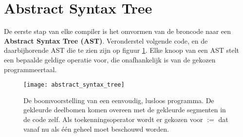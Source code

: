 \section{Abstract Syntax Tree}
De eerste stap van elke compiler is het omvormen van de broncode naar een \textbf{Abstract Syntax Tree (AST)}. Veronderstel volgende code, en de daarbijhorende AST die te zien zijn op figuur \ref{fig:abstract_syntax_tree}. Elke knoop van een AST stelt een bepaalde geldige operatie voor, die onafhankelijk is van de gekozen programmeertaal.
\begin{figure}[h]
	\centering
	\texttt{[image: abstract\_syntax\_tree]}
	\caption{De boomvoorstelling van een eenvoudig, lusloos programma. De gekleurde deelbomen komen overeen met de gekleurde segmenten in de code zelf. Als toekenningsoperator wordt er gekozen voor $:=$ dat vanaf nu als één geheel moet beschouwd worden.}
	\label{fig:abstract_syntax_tree}
\end{figure}

